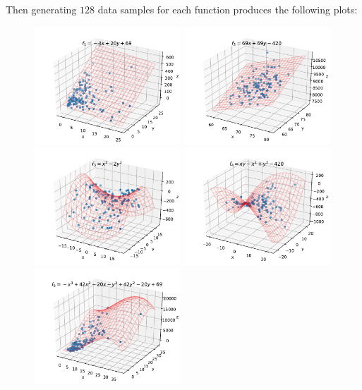 \documentclass[12pt]{article}
\begin{document}
        Then generating $128$ data samples for each function produces the following plots:
        \begin{figure}[H]
            \centering
            \includegraphics[width=0.49\textwidth]{f_1.pdf}
            \includegraphics[width=0.49\textwidth]{f_2.pdf}
            \includegraphics[width=0.49\textwidth]{f_3.pdf}
            \includegraphics[width=0.49\textwidth]{f_4.pdf}
            \includegraphics[width=0.49\textwidth]{f_5.pdf}

\end{figure}
\end{document}
